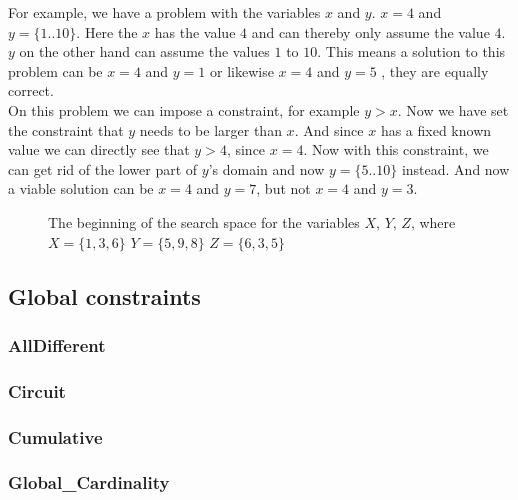 \begin{framed}
For example, we have a problem with the variables $x$ and $y$. $x = 4$ and $y = \{1..10\}$. Here the $x$ has the value $4$ and can thereby only assume the value $4$. $y$ on the other hand can assume the values $1$ to $10$. This means a solution to this problem can be $x = 4$ and $y = 1$ or likewise $x = 4$ and $y = 5$ , they are equally correct.\\
On this problem we can impose a constraint, for example $y > x$. Now we have set the constraint that $y$ needs to be larger than $x$. And since $x$ has a fixed known value we can directly see that $y > 4$, since $x = 4$. Now with this constraint, we can get rid of the lower part of $y$'s domain and now $y = \{5..10\}$ instead. And now a viable solution can be $x = 4$ and $y = 7$, but not $x = 4$ and $y = 3$.
\end{framed}

\begin{figure}
  \caption{The beginning of the search space for the variables $X$, $Y$, $Z$, where $X=\{1,3,6\}$ $Y=\{5,9,8\}$ $Z=\{6,3,5\}$}
  \label{fig:search_space}
\end{figure}

\subsection{Global constraints}
\subsubsection{AllDifferent}
\subsubsection{Circuit}
\subsubsection{Cumulative}
\subsubsection{Global_Cardinality}



